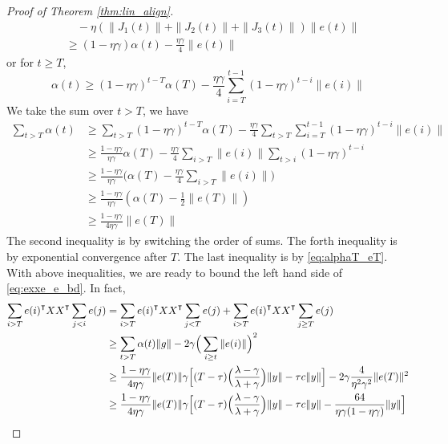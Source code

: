 \begin{proof}[Proof of Theorem \ref{thm:lin_align}]
\begin{equation*}
\begin{aligned}
    &\quad-\eta(\|J_1(t)\|+\|J_2(t)\|+\|J_3(t)\|)\|e(t)\| \\
    &\geq (1-\eta\gamma)\alpha(t) - \frac{\eta\gamma}{4}\|e(t)\|
\end{aligned}
\end{equation*}
or for $t\geq T$,
\begin{equation}
    \alpha(t) \geq (1-\eta\gamma)^{t-T}\alpha(T) - \frac{\eta\gamma}{4}\sum_{i=T}^{t-1}(1-\eta\gamma)^{t-i}\|e(i)\|
\end{equation}
We take the sum over $t>T$, we have
\begin{equation}
\label{eq:sum_alphat}
\begin{aligned}
    \sum_{t>T}\alpha(t) 
    &\geq \sum_{t>T}(1-\eta\gamma)^{t-T}\alpha(T) - \frac{\eta\gamma}{4}\sum_{t>T}\sum_{i=T}^{t-1}(1-\eta\gamma)^{t-i}\|e(i)\|  \\
    &\geq \frac{1-\eta\gamma}{\eta\gamma}\alpha(T) - \frac{\eta\gamma}{4}\sum_{i>T}\|e(i)\|\sum_{t>i}(1-\eta\gamma)^{t-i} \\
    &\geq \frac{1-\eta\gamma}{\eta\gamma} \Big(\alpha(T)-\frac{\eta\gamma}{4}\sum_{i>T}\|e(i)\|\Big) \\
    &\geq \frac{1-\eta\gamma}{\eta\gamma}(\alpha(T)-\frac{1}{2}\|e(T)\|) \\
    &\geq \frac{1-\eta\gamma}{4\eta\gamma}\|e(T)\|
\end{aligned}
\end{equation}
The second inequality is by switching the order of sums. The forth inequality is by exponential convergence after $T$. The last inequality is by \eqref{eq:alphaT_eT}. With above inequalities, we are ready to bound the left hand side of \eqref{eq:exxe_e_bd}. In fact,
\begin{equation}
\label{eq:lhs_bound}
\begin{aligned}
    \sum_{i>T}e(i)\transpose XX\transpose \sum_{j<i}e(j) 
    &=\sum_{i>T}e(i)\transpose XX\transpose \sum_{j<T}e(j) +\sum_{i>T}e(i)\transpose XX\transpose \sum_{j\geq T}e(j) \\
    &\geq \sum_{t>T}\alpha(t)\|g\|-2\gamma \Big(\sum_{i\geq t}\|e(i)\|\Big)^2 \\
    &\geq \frac{1-\eta\gamma}{4\eta\gamma}\|e(T)\|\gamma\Big[(T-\tau)\Big(\frac{\lambda-\gamma}{\lambda+\gamma}\Big)\|y\| - \tau c\|y\|\Big] - 2\gamma\frac{4}{\eta^2\gamma^2}\|e(T)\|^2\\
    &\geq \frac{1-\eta\gamma}{4\eta\gamma}\|e(T)\|\gamma\Big[(T-\tau)\Big(\frac{\lambda-\gamma}{\lambda+\gamma}\Big)\|y\| - \tau c\|y\| - \frac{64}{\eta\gamma(1-\eta\gamma)}\|y\|\Big] \\

\end{aligned}
\end{equation}
\end{proof}

